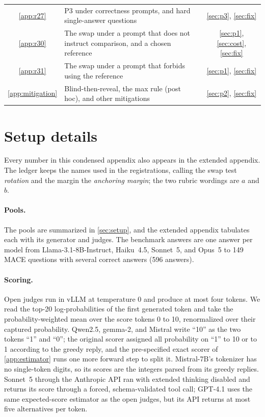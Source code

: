 \begin{center}
\begin{tabular}{cL{10.6cm}c}
\ref{app:r27} & P3 under correctness prompts, and hard single-answer questions & \ref{sec:p3}, \ref{sec:fix} \\
\ref{app:r30} & The swap under a prompt that does not instruct comparison, and a chosen reference & \ref{sec:p1}, \ref{sec:cost}, \ref{sec:fix} \\
\ref{app:r31} & The swap under a prompt that forbids using the reference & \ref{sec:p1}, \ref{sec:fix} \\
\ref{app:mitigation} & Blind-then-reveal, the max rule (post hoc), and other mitigations & \ref{sec:p2}, \ref{sec:fix} \\
\bottomrule
\end{tabular}
\end{center}

\FloatBarrier
\section{Setup details}
\label{app:setup}

Every number in this condensed appendix also appears in the extended appendix. The ledger keeps the names used in the registrations, calling the swap test \emph{rot\-ation} and the margin the \emph{an\-choring margin}; the two rubric wordings are $a$ and $b$.

\paragraph{Pools.}
The pools are summarized in \cref{sec:setup}, and the extended appendix tabulates each with its generator and judges. The benchmark answers are one answer per model from Llama-3.1-8B-Instruct, Haiku~4.5, Sonnet~5, and Opus~5 to 149 \textsc{MACE} questions with several correct answers (596 answers). \paragraph{Scoring.}
Open judges run in vLLM at temperature 0 and produce at most four tokens. We read the top-20 log-probabilities of the first generated token and take the probability-weighted mean over the score tokens 0 to 10, renormalized over their captured probability. Qwen2.5, gemma-2, and Mistral write ``10'' as the two tokens ``1'' and ``0''; the original scorer assigned all probability on ``1'' to 10 or to 1 according to the greedy reply, and the pre-specified exact scorer of \cref{app:estimator} runs one more forward step to split it. Mistral-7B's tokenizer has no single-token digits, so its scores are the integers parsed from its greedy replies. Sonnet~5 through the Anthropic API ran with extended thinking disabled and returns its score through a forced, schema-validated tool call; GPT-4.1 uses the same expected-score estimator as the open judges, but its API returns at most five alternatives per token.

